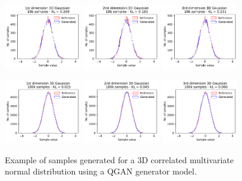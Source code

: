 \documentclass[twocolumn,preprintnumbers,superscriptaddress]{revtex4-2}
\begin{document}
\begin{figure}
  \includegraphics[width=0.3\textwidth]{plots/3Dgaussian_posdef/1-distribution_3dgaussian_10k.pdf}%
  \includegraphics[width=0.3\textwidth]{plots/3Dgaussian_posdef/2-distribution_3dgaussian_10k.pdf}%
  \includegraphics[width=0.3\textwidth]{plots/3Dgaussian_posdef/3-distribution_3dgaussian_10k.pdf}

  \includegraphics[width=0.3\textwidth]{plots/3Dgaussian_posdef/1-distribution_3dgaussian_100k.pdf}%
  \includegraphics[width=0.3\textwidth]{plots/3Dgaussian_posdef/2-distribution_3dgaussian_100k.pdf}%
  \includegraphics[width=0.3\textwidth]{plots/3Dgaussian_posdef/3-distribution_3dgaussian_100k.pdf}

  \caption{\label{fig:3dgauss}Example of samples generated for a 3D correlated
  multivariate normal distribution using a QGAN generator model.}
\end{figure}
\end{document}
